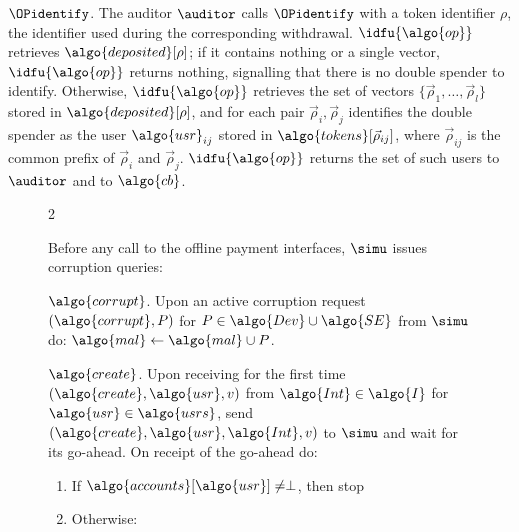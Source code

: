 \underline{$\OPidentify$}. The auditor $\auditor$ calls $\OPidentify$ with a
token identifier $\rho$, the identifier used during the corresponding
withdrawal.  $\idfu{\algo{op}}$ retrieves $\algo{deposited}[\rho]$; if it contains
nothing or a single vector, $\idfu{\algo{op}}$ returns nothing, signalling that there is
no double spender to identify. Otherwise, $\idfu{\algo{op}}$ retrieves the set of
vectors $\{\vec{\rho}_1, \ldots, \vec{\rho}_l\}$ stored in
$\algo{deposited}[\rho]$, and for each pair $\vec{\rho}_i, \vec{\rho}_j$
identifies the double spender as the user $\algo{usr}_{ij}$ stored in
$\algo{tokens}[\vec{\rho}_{ij}]$, where $\vec{\rho}_{ij}$ is the common prefix
of $\vec{\rho}_i$ and $\vec{\rho}_j$. $\idfu{\algo{op}}$ returns the set of such users
to $\auditor$ and to $\algo{cb}$.

\begin{figure} \centering \hspace*{-0.05\textwidth}
  \begin{minipage}{1.1\textwidth}

    \begin{framed} \scriptsize


      \begin{multicols}{2}

        Before any call to the offline payment interfaces, $\simu$ issues
        corruption queries:

        {$\algo{corrupt}$.} Upon an active corruption request $(\algo{corrupt},
        P)$ for $P \in \algo{Dev} \cup \algo{SE}$ from $\simu$ do: $\algo{mal}
        \gets \algo{mal} \cup P$.

        {$\algo{create}$.} Upon receiving for the first time $(\algo{create},
        \algo{usr}, v)$ from $\algo{Int} \in \algo{I}$ for $\algo{usr} \in
        \algo{usrs}$, send $(\algo{create}, \algo{usr}, \algo{Int}, v)$ to
        $\simu$ and wait for its go-ahead. On receipt of the go-ahead do:

        \begin{enumerate}

          \item If $\algo{accounts}[\algo{usr}] \neq \perp$, then stop

          \item Otherwise:

            \begin{enumerate}


\end{enumerate}
\end{enumerate}
\end{multicols}
\end{framed}
\end{minipage}
\end{figure}
